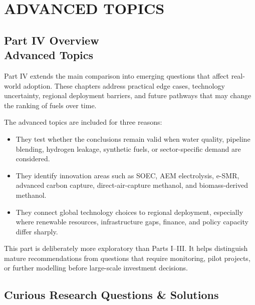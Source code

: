 \documentclass[12pt,twoside,openany]{book}
\let\cleardoublepage\clearpage
\begin{document}

\part{ADVANCED TOPICS}

\cleardoublepage
{}
\chapter*{Part IV Overview\\Advanced Topics}

Part IV extends the main comparison into emerging questions that affect real-world adoption. These chapters address practical edge cases, technology uncertainty, regional deployment barriers, and future pathways that may change the ranking of fuels over time.

The advanced topics are included for three reasons:

\begin{itemize}
    \item They test whether the conclusions remain valid when water quality, pipeline blending, hydrogen leakage, synthetic fuels, or sector-specific demand are considered.
    \item They identify innovation areas such as SOEC, AEM electrolysis, e-SMR, advanced carbon capture, direct-air-capture methanol, and biomass-derived methanol.
    \item They connect global technology choices to regional deployment, especially where renewable resources, infrastructure gaps, finance, and policy capacity differ sharply.
\end{itemize}

This part is deliberately more exploratory than Parts I--III. It helps distinguish mature recommendations from questions that require monitoring, pilot projects, or further modelling before large-scale investment decisions.


\chapter{Curious Research Questions \& Solutions}
\end{document}
